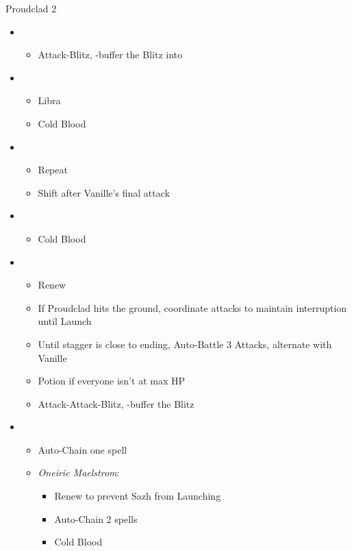 \begin{battle}[2:01]{Proudclad 2}
		\begin{itemize}
			\item \second
			      \begin{itemize}
				      \item Attack-Blitz, \rav-buffer the Blitz into
			      \end{itemize}
			\item \sixth
			      \begin{itemize}
				      \item Libra
				      \item Cold Blood
			      \end{itemize}
			\item \fifth
			      \begin{itemize}
				      \item Repeat
				      \item Shift after Vanille's final attack
			      \end{itemize}
			\item \first
			      \begin{itemize}
				      \item Cold Blood
			      \end{itemize}
			\item \second
			      \begin{itemize}
				      \item Renew
				      \item If Proudclad hits the ground, coordinate attacks to maintain interruption until Launch
				      \item Until stagger is close to ending, Auto-Battle 3 Attacks, alternate with Vanille
				      \item Potion if everyone isn't at max HP
				      \item Attack-Attack-Blitz, \rav-buffer the Blitz
			      \end{itemize}
			\item \third
			      \begin{itemize}
				      \item Auto-Chain one spell
				      \item \textit{Oneiric Maelstrom}:
				            \begin{itemize}
					            \item Renew to prevent Sazh from Launching
					            \item Auto-Chain 2 spells
					            \item Cold Blood

\end{itemize}
\end{itemize}
\end{itemize}
\end{battle}
